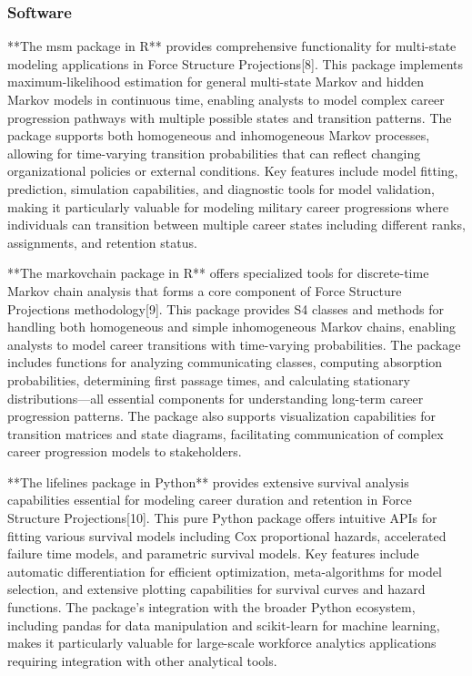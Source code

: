 \documentclass[main.tex]{subfiles}
\begin{document}
\subsubsection{Software}

**The msm package in R** provides comprehensive functionality for multi-state modeling applications in Force Structure Projections[8]. This package implements maximum-likelihood estimation for general multi-state Markov and hidden Markov models in continuous time, enabling analysts to model complex career progression pathways with multiple possible states and transition patterns. The package supports both homogeneous and inhomogeneous Markov processes, allowing for time-varying transition probabilities that can reflect changing organizational policies or external conditions. Key features include model fitting, prediction, simulation capabilities, and diagnostic tools for model validation, making it particularly valuable for modeling military career progressions where individuals can transition between multiple career states including different ranks, assignments, and retention status.

**The markovchain package in R** offers specialized tools for discrete-time Markov chain analysis that forms a core component of Force Structure Projections methodology[9]. This package provides S4 classes and methods for handling both homogeneous and simple inhomogeneous Markov chains, enabling analysts to model career transitions with time-varying probabilities. The package includes functions for analyzing communicating classes, computing absorption probabilities, determining first passage times, and calculating stationary distributions—all essential components for understanding long-term career progression patterns. The package also supports visualization capabilities for transition matrices and state diagrams, facilitating communication of complex career progression models to stakeholders.

**The lifelines package in Python** provides extensive survival analysis capabilities essential for modeling career duration and retention in Force Structure Projections[10]. This pure Python package offers intuitive APIs for fitting various survival models including Cox proportional hazards, accelerated failure time models, and parametric survival models. Key features include automatic differentiation for efficient optimization, meta-algorithms for model selection, and extensive plotting capabilities for survival curves and hazard functions. The package's integration with the broader Python ecosystem, including pandas for data manipulation and scikit-learn for machine learning, makes it particularly valuable for large-scale workforce analytics applications requiring integration with other analytical tools.
\end{document}
